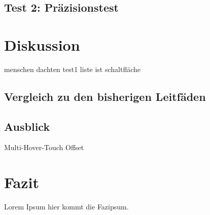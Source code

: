 \documentclass[a4paper,12pt,bibliography=totoc]{scrreprt}%
\begin{document}
\section{Test 2: Präzisionstest}


\chapter{Diskussion}
menschen dachten test1 liste ist schaltfläche

\section{Vergleich zu den bisherigen Leitfäden}


\section{Ausblick}
Multi-Hover-Touch
Offset

\chapter{Fazit}
Lorem Ipsum hier kommt die Fazipsum.
\end{document}
